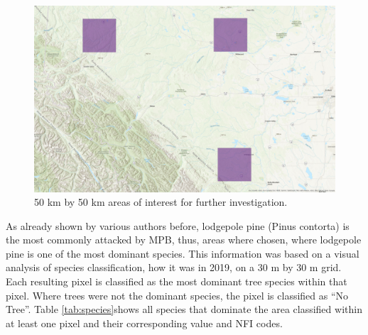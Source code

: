 \documentclass[
]{article}
\begin{document}
\begin{figure}

{\centering \includegraphics[width=0.8\linewidth]{../graphics/AreasOfInterest} 

}

\caption{50 km by 50 km areas of interest for further investigation.}\label{fig:AoIs}
\end{figure}

As already shown by various authors before, lodgepole pine (Pinus contorta) is the most commonly attacked by MPB, thus, areas where chosen, where lodgepole pine is one of the most dominant species. This information was based on a visual analysis of species classification, how it was in 2019, on a 30 m by 30 m grid. Each resulting pixel is classified as the most dominant tree species within that pixel. Where trees were not the dominant species, the pixel is classified as ``No Tree''. Table \ref{tab:species}shows all species that dominate the area classified within at least one pixel and their corresponding value and NFI codes.
\end{document}
